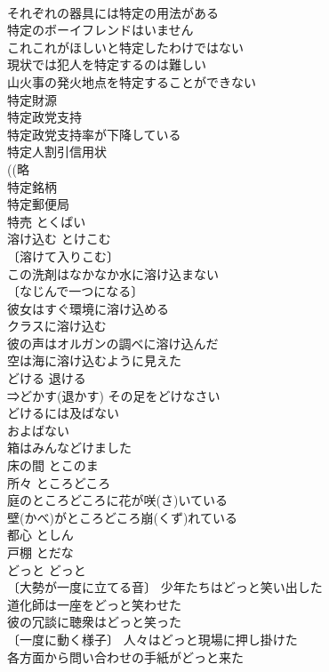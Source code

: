\documentclass[8pt]{extreport}
\begin{document}
\begin{CJK}{UTF8}{min}
\\	それぞれの器具には特定の用法がある 
\\	特定のボーイフレンドはいません 
\\	これこれがほしいと特定したわけではない 
\\	現状では犯人を特定するのは難しい 
\\	山火事の発火地点を特定することができない 
\\	特定財源 
\\	特定政党支持 
\\	特定政党支持率が下降している 
\\	特定人割引信用状 
\\	((略
\\	特定銘柄 
\\	特定郵便局 
\\	特売	とくばい	
\\	溶け込む	とけこむ	
\\	〔溶けて入りこむ〕
\\	この洗剤はなかなか水に溶け込まない 
\\	〔なじんで一つになる〕
\\	彼女はすぐ環境に溶け込める 
\\	クラスに溶け込む 
\\	彼の声はオルガンの調べに溶け込んだ 
\\	空は海に溶け込むように見えた 
\\	どける	退ける	
\\	⇒どかす(退かす) その足をどけなさい 
\\	どけるには及ばない 
\\	およばない　
\\	箱はみんなどけました 
\\	床の間	とこのま	
\\	所々	ところどころ	
\\	庭のところどころに花が咲(さ)いている 
\\	壁(かべ)がところどころ崩(くず)れている 
\\	都心	としん	
\\	戸棚	とだな	
\\	どっと	どっと	
\\	〔大勢が一度に立てる音〕 少年たちはどっと笑い出した 
\\	道化師は一座をどっと笑わせた 
\\	彼の冗談に聴衆はどっと笑った 
\\	〔一度に動く様子〕 人々はどっと現場に押し掛けた 
\\	各方面から問い合わせの手紙がどっと来た 

\end{CJK}
\end{document}
